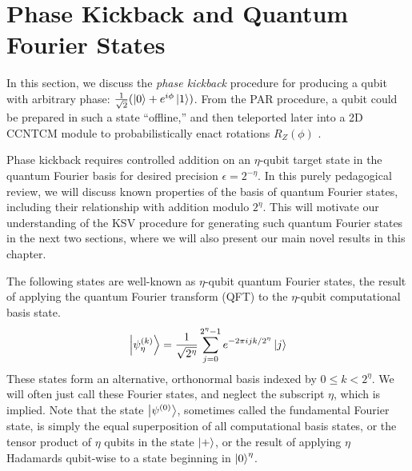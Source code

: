 \section{Phase Kickback and Quantum Fourier States}
\label{sec:qcompile-qfs}

In this section, we discuss the \emph{phase kickback} procedure for
producing a qubit with arbitrary phase: $\frac{1}{\sqrt{2}} (\left\vert{0}\right\rangle + e^{i\phi}\left\vert{1}\right\rangle )$.
From the PAR procedure, a qubit could be prepared in such a state
``offline,'' and then teleported later into a \textsf{2D CCNTCM} module to
probabilistically enact rotations $R_Z(\phi)$ \cite{Jones2012}.

Phase kickback requires controlled addition on an $\eta$-qubit target state in 
the quantum Fourier basis for desired precision $\epsilon = 2^{-\eta}$.
In this purely pedagogical review,
we will discuss known properties of the
basis of quantum Fourier states, including their relationship with
addition modulo $2^{\eta}$.
This will motivate our
understanding of the KSV procedure for generating such quantum Fourier
states in the next two sections, where we will also present our
main novel results in this chapter.



The following states are well-known as $\eta$-qubit quantum Fourier states,
the result of applying the quantum Fourier transform (QFT)
to the $\eta$-qubit computational basis state. 
%
\begin{equation}
\left\vert{\psi^{(k)}_{\eta}}\right\rangle = \frac{1}{\sqrt{2^{\eta}}} \sum_{j=0}^{2^{\eta}-1}
e^{-2\pi i j k / 2^{\eta}} \left\vert{j}\right\rangle
\end{equation}
%
These states form an alternative, orthonormal basis indexed by
$0 \le k < 2^{\eta}$. We will often just call these Fourier states,
and neglect the subscript $\eta$, which is implied.
Note that the state $\left\vert{\psi^{(0)}}\right\rangle$, sometimes
called the fundamental Fourier state, is simply the equal superposition
of all computational basis states, or the tensor product of
$\eta$ qubits in the state $\left\vert{+}\right\rangle$, or the result of applying
$\eta$ Hadamards qubit-wise to a state beginning in $\left\vert{0}\right\rangle^\eta$.

